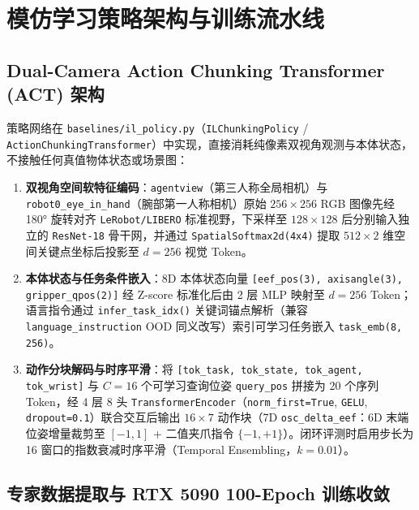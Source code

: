 \documentclass[11pt,a4paper]{article}
\begin{document}
\section{模仿学习策略架构与训练流水线}

\subsection{Dual-Camera Action Chunking Transformer (ACT) 架构}

策略网络在 \texttt{baselines/il\_policy.py}（\texttt{ILChunkingPolicy} / \texttt{ActionChunkingTransformer}）中实现，直接消耗纯像素双视角观测与本体状态，不接触任何真值物体状态或场景图：
\begin{enumerate}[leftmargin=1.6em,itemsep=2pt]
  \item \textbf{双视角空间软特征编码}：\texttt{agentview}（第三人称全局相机）与 \texttt{robot0\_eye\_in\_hand}（腕部第一人称相机）原始 $256\times 256$ RGB 图像先经 180° 旋转对齐 \texttt{LeRobot/LIBERO} 标准视野，下采样至 $128\times 128$ 后分别输入独立的 \texttt{ResNet-18} 骨干网，并通过 \texttt{SpatialSoftmax2d(4x4)} 提取 $512\times 2$ 维空间关键点坐标后投影至 $d=256$ 视觉 Token。
  \item \textbf{本体状态与任务条件嵌入}：8D 本体状态向量 \texttt{[eef\_pos(3), axisangle(3), gripper\_qpos(2)]} 经 Z-score 标准化后由 2 层 MLP 映射至 $d=256$ Token；语言指令通过 \texttt{infer\_task\_idx()} 关键词锚点解析（兼容 \texttt{language\_instruction} OOD 同义改写）索引可学习任务嵌入 \texttt{task\_emb(8, 256)}。
  \item \textbf{动作分块解码与时序平滑}：将 \texttt{[tok\_task, tok\_state, tok\_agent, tok\_wrist]} 与 $C=16$ 个可学习查询位姿 \texttt{query\_pos} 拼接为 20 个序列 Token，经 4 层 8 头 \texttt{TransformerEncoder}（\texttt{norm\_first=True}, \texttt{GELU}, \texttt{dropout=0.1}）联合交互后输出 $16\times 7$ 动作块（7D \texttt{osc\_delta\_eef}：6D 末端位姿增量裁剪至 $[-1,1]$ + 二值夹爪指令 $\{-1, +1\}$）。闭环评测时启用步长为 16 窗口的指数衰减时序平滑（Temporal Ensembling，$k=0.01$）。
\end{enumerate}

\subsection{专家数据提取与 RTX 5090 100-Epoch 训练收敛}
\end{document}
